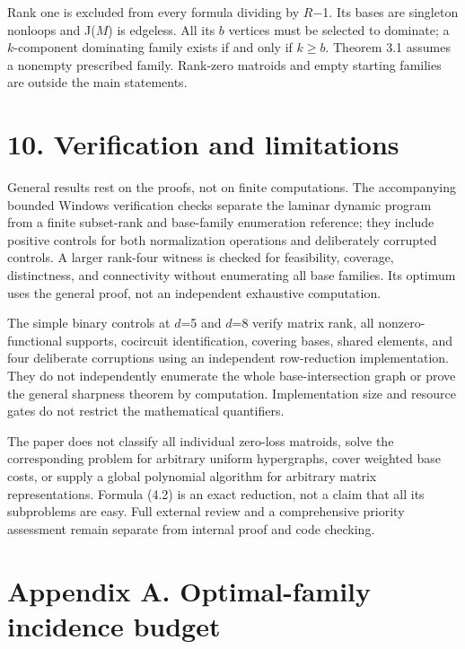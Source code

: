 \documentclass[11pt]{article}
\begin{document}
Rank one is excluded from every formula dividing by \(R\)\ensuremath{-}1. Its bases are singleton nonloops and J(\(M\)) is edgeless. All its \(b\) vertices must be selected to dominate; a \(k\)-component dominating family exists if and only if \(k\ge b\). Theorem 3.1 assumes a nonempty prescribed family. Rank-zero matroids and empty starting families are outside the main statements.

\section*{10. Verification and limitations}

General results rest on the proofs, not on finite computations. The accompanying bounded Windows verification checks separate the laminar dynamic program from a finite subset-rank and base-family enumeration reference; they include positive controls for both normalization operations and deliberately corrupted controls. A larger rank-four witness is checked for feasibility, coverage, distinctness, and connectivity without enumerating all base families. Its optimum uses the general proof, not an independent exhaustive computation.

The simple binary controls at \(d\)=5 and \(d\)=8 verify matrix rank, all nonzero-functional supports, cocircuit identification, covering bases, shared elements, and four deliberate corruptions using an independent row-reduction implementation. They do not independently enumerate the whole base-intersection graph or prove the general sharpness theorem by computation. Implementation size and resource gates do not restrict the mathematical quantifiers.

The paper does not classify all individual zero-loss matroids, solve the corresponding problem for arbitrary uniform hypergraphs, cover weighted base costs, or supply a global polynomial algorithm for arbitrary matrix representations. Formula (4.2) is an exact reduction, not a claim that all its subproblems are easy. Full external review and a comprehensive priority assessment remain separate from internal proof and code checking.

\section*{Appendix A. Optimal-family incidence budget}
\end{document}
